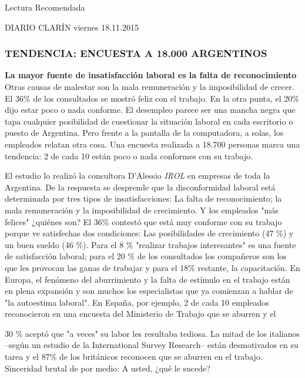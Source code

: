 Lectura Recomendada

DIARIO CLARÍN viernes 18.11.2015

\subsubsection*{TENDENCIA: ENCUESTA A 18.000 ARGENTINOS}
\textbf{La mayor fuente de insatisfacción laboral es la falta de reconocimiento} Otras causas de malestar son la mala remuneración y la imposibilidad de crecer. El 36\% de los consultados se mostró feliz con el trabajo. En la otra punta, el 20\% dijo estar poco o nada conforme. El desempleo parece ser una mancha negra que tapa cualquier posibilidad de cuestionar la situación laboral en cada escritorio o puesto de Argentina. Pero frente a la pantalla de la computadora, a solas, los empleados relatan otra cosa. Una encuesta realizada a 18.700 personas marca una tendencia: 2 de cada 10 están poco o nada conformes con su trabajo.

El estudio lo realizó la consultora D'Alessio \textit{IROL }en empresas de toda la Argentina. De la respuesta se desprende que la disconformidad laboral está determinada por tres tipos de insatisfacciones: La falta de reconocimiento; la mala remuneración y la imposibilidad de crecimiento. Y los empleados "más felices" ¿quiénes son? El 36\% contestó que está muy conforme con su trabajo porque ve satisfechas dos condiciones: Las posibilidades de crecimiento (47 \%) y un buen sueldo (46 \%). Para el 8 \% "realizar trabajos interesantes" es una fuente de satisfacción laboral; para el 20 \% de los consultados los compañeros son los que les provocan las ganas de trabajar y para el 18\% restante, la capacitación. En Europa, el fenómeno del aburrimiento y la falta de estímulo en el trabajo están en plena expansión y son muchos los especialistas que ya comienzan a hablar de "la autoestima laboral". En España, por ejemplo, 2 de cada 10 empleados reconocieron en una encuesta del Ministerio de Trabajo que se aburren y el



30 \% aceptó que "a veces" su labor les resultaba tediosa. La mitad de los italianos –según un estudio de la International Survey Research– están desmotivados en su tarea y el 87\% de los británicos reconocen que se aburren en el trabajo. Sinceridad brutal de por medio: A usted, ¿qué le sucede?

